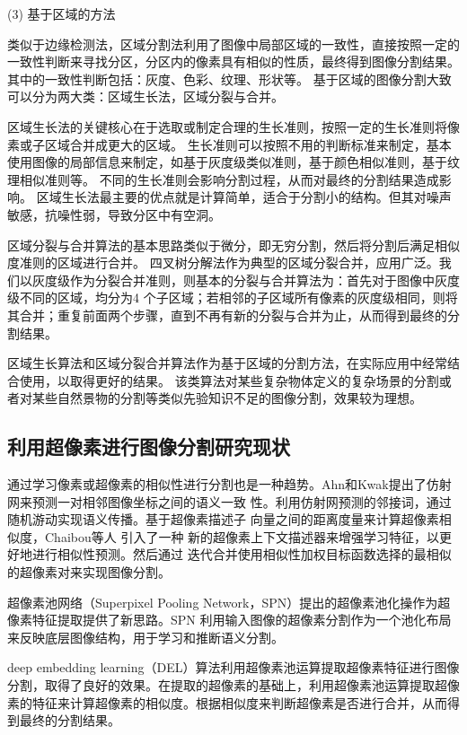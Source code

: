 (3) 基于区域的方法

类似于边缘检测法，区域分割法利用了图像中局部区域的一致性，直接按照一定的一致性判断来寻找分区，分区内的像素具有相似的性质，最终得到图像分割结果。其中的一致性判断包括：灰度、色彩、纹理、形状等。
基于区域的图像分割大致可以分为两大类：区域生长法，区域分裂与合并。

区域生长法的关键核心在于选取或制定合理的生长准则，按照一定的生长准则将像素或子区域合并成更大的区域。
生长准则可以按照不用的判断标准来制定，基本使用图像的局部信息来制定，如基于灰度级类似准则，基于颜色相似准则，基于纹理相似准则等。
不同的生长准则会影响分割过程，从而对最终的分割结果造成影响。
区域生长法最主要的优点就是计算简单，适合于分割小的结构。但其对噪声敏感，抗噪性弱，导致分区中有空洞。

区域分裂与合并算法的基本思路类似于微分，即无穷分割，然后将分割后满足相似度准则的区域进行合并。
四叉树分解法作为典型的区域分裂合并，应用广泛。我们以灰度级作为分裂合并准则，则基本的分裂与合并算法为：首先对于图像中灰度级不同的区域，均分为4 个子区域；若相邻的子区域所有像素的灰度级相同，则将其合并；重复前面两个步骤，直到不再有新的分裂与合并为止，从而得到最终的分割结果。

区域生长算法和区域分裂合并算法作为基于区域的分割方法，在实际应用中经常结合使用，以取得更好的结果。
该类算法对某些复杂物体定义的复杂场景的分割或者对某些自然景物的分割等类似先验知识不足的图像分割，效果较为理想。

\subsection{利用超像素进行图像分割研究现状}

通过学习像素或超像素的相似性进行分割也是一种趋势\cite{chaibou2019learning}。Ahn和Kwak\cite{ahn2018learning}提出了仿射网来预测一对相邻图像坐标之间的语义一致
性。利用仿射网预测的邻接词，通过随机游动实现语义传播。基于超像素描述子
向量之间的距离度量来计算超像素相似度，Chaibou等人\cite{carpineto2012consensus} 引入了一种
新的超像素上下文描述器来增强学习特征，以更好地进行相似性预测。然后通过
迭代合并使用相似性加权目标函数选择的最相似的超像素对来实现图像分割。


超像素池网络（Superpixel Pooling Network，SPN）\cite{kwak2017weakly}提出的超像素池化操作为超像素特征提取提供了新思路。SPN 利用输入图像的超像素分割作为一个池化布局来反映底层图像结构，用于学习和推断语义分割。

deep embedding learning（DEL）\cite{liu2018deep}算法利用超像素池运算提取超像素特征进行图像分割，取得了良好的效果。在提取的超像素的基础上，利用超像素池运算提取超像素的特征来计算超像素的相似度。根据相似度来判断超像素是否进行合并，从而得到最终的分割结果。

